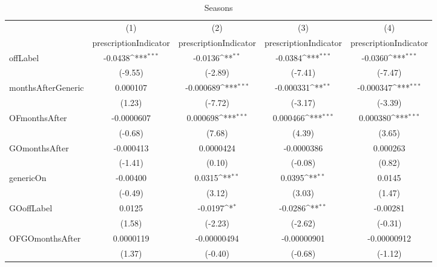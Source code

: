 \begin{table}[htbp]\centering
\def\sym#1{\ifmmode^{#1}\else\(^{#1}\)\fi}
\caption{Seasons\label{tab1}}
\begin{tabular}{l*{4}{c}}
\hline\hline
            &\multicolumn{1}{c}{(1)}&\multicolumn{1}{c}{(2)}&\multicolumn{1}{c}{(3)}&\multicolumn{1}{c}{(4)}\\
            &\multicolumn{1}{c}{prescriptionIndicator}&\multicolumn{1}{c}{prescriptionIndicator}&\multicolumn{1}{c}{prescriptionIndicator}&\multicolumn{1}{c}{prescriptionIndicator}\\
\hline
offLabel    &     -0.0438\sym{***}&     -0.0136\sym{**} &     -0.0384\sym{***}&     -0.0360\sym{***}\\
            &     (-9.55)         &     (-2.89)         &     (-7.41)         &     (-7.47)         \\
[1em]
monthsAfterGeneric&    0.000107         &   -0.000689\sym{***}&   -0.000331\sym{**} &   -0.000347\sym{***}\\
            &      (1.23)         &     (-7.72)         &     (-3.17)         &     (-3.39)         \\
[1em]
OFmonthsAfter&  -0.0000607         &    0.000698\sym{***}&    0.000466\sym{***}&    0.000380\sym{***}\\
            &     (-0.68)         &      (7.68)         &      (4.39)         &      (3.65)         \\
[1em]
GOmonthsAfter&   -0.000413         &   0.0000424         &  -0.0000386         &    0.000263         \\
            &     (-1.41)         &      (0.10)         &     (-0.08)         &      (0.82)         \\
[1em]
genericOn   &    -0.00400         &      0.0315\sym{**} &      0.0395\sym{**} &      0.0145         \\
            &     (-0.49)         &      (3.12)         &      (3.03)         &      (1.47)         \\
[1em]
GOoffLabel  &      0.0125         &     -0.0197\sym{*}  &     -0.0286\sym{**} &    -0.00281         \\
            &      (1.58)         &     (-2.23)         &     (-2.62)         &     (-0.31)         \\
[1em]
OFGOmonthsAfter&   0.0000119         & -0.00000494         & -0.00000901         & -0.00000912         \\
            &      (1.37)         &     (-0.40)         &     (-0.68)         &     (-1.12)         \\

\end{tabular}
\end{table}
